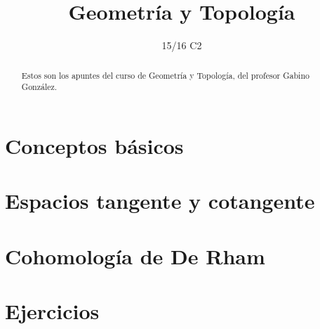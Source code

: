 \documentclass[palatino]{apuntes}
\title{Geometría y Topología}
\author{}
\date{15/16 C2}
\begin{document}
\pagestyle{plain}

\begin{abstract}
Estos son los apuntes del curso de Geometría y Topología, del profesor Gabino González.
\end{abstract}

\maketitle


\tableofcontents
\newpage

\chapter{Conceptos básicos}

\chapter{Espacios tangente y cotangente}

\chapter{Cohomología de De Rham}

\appendix

\chapter{Ejercicios}

\printindex
\end{document}
